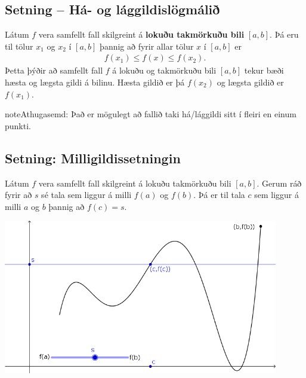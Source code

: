 \documentclass[a4paper,10pt,icelandic]{sphinxmanual}
\begin{document}
\subsection{Setning – Há- og lággildislögmálið}
\label{kafli02:ha-og-laggildislogmali}\label{kafli02:setning-ha-og-laggildislogmali}\label{kafli02:index-12}
Látum \(f\) vera samfellt fall skilgreint á \textbf{lokuðu takmörkuðu bili}
\([a,b]\). Þá eru til tölur \(x_1\) og \(x_2\) í
\([a,b]\) þannig að fyrir allar tölur \(x\) í \([a,b]\) er
\begin{equation*}
\begin{split}f(x_1)\leq f(x)\leq f(x_2).\end{split}
\end{equation*}
Þetta þýðir að samfellt fall \(f\) á lokuðu og takmörkuðu bili
\([a,b]\) tekur bæði hæsta og lægsta gildi á bilinu. Hæsta gildið er
þá \(f(x_2)\) og lægsta gildið er \(f(x_1)\).

\begin{notice}{note}{Athugasemd:}
Það er mögulegt að fallið taki há/lággildi sitt í fleiri en einum
punkti.
\end{notice}


\subsection{Setning: Milligildissetningin}
\label{kafli02:index-13}\label{kafli02:setning-milligildissetningin}
Látum \(f\) vera samfellt fall skilgreint á lokuðu takmörkuðu bili
\([a,b]\). Gerum ráð fyrir að \(s\) sé tala sem liggur á milli
\(f(a)\) og \(f(b)\). Þá er til tala \(c\) sem liggur á
milli \(a\) og \(b\) þannig að \(f(c)=s\).


\begin{center}
\includegraphics[width=12cm,keepaspectratio=true]{10_milligildissetn.png}
\end{center}
\end{document}
